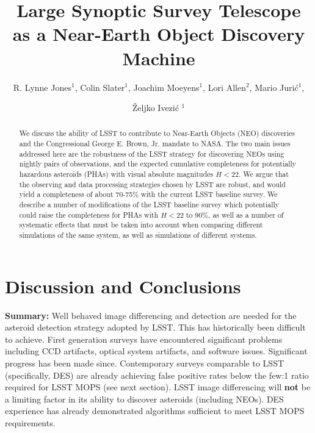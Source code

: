 \documentclass[12pt,preprint]{aastex}
\begin{document}
\title{Large Synoptic Survey Telescope as a Near-Earth Object Discovery Machine}

\author{R. Lynne Jones$^1$, Colin Slater$^1$, Joachim Moeyens$^1$, 
Lori Allen$^2$, Mario Juri\'{c}$^1$,  \and \v{Z}eljko Ivezi\'{c} $^1$}


\begin{abstract}
We discuss the ability of LSST to contribute to Near-Earth Objects (NEO) discoveries and
the Congressional George E. Brown, Jr. mandate to NASA. The two main issues addressed 
here are the robustness of the LSST strategy for discovering NEOs using nightly pairs of 
observations, and the expected cumulative completeness for potentially hazardous asteroids
(PHAs) with visual absolute magnitudes $H<22$.  We argue that the observing and data 
processing strategies chosen by LSST are robust, and would yield a completeness of about 
70-75\% with the current LSST baseline survey. We describe a number of modifications of the 
LSST baseline survey which potentially could raise the completeness for PHAs with $H<22$
to 90\%, as well as a number of systematic effects that must be taken into account when
comparing different simulations of the same system, as well as simulations of different
systems. 
\end{abstract}

\keywords{}

 

 



 




\section{Discussion and Conclusions}


{\bf Summary:} Well behaved image differencing and detection are needed for the
asteroid detection strategy adopted by LSST. This has historically
been difficult to achieve. First generation surveys have encountered
significant problems including CCD artifacts, optical system
artifacts, and software issues. Significant progress has been made
since. Contemporary surveys comparable to LSST (specifically, DES) are
already achieving false positive rates below the few:1 ratio required
for LSST MOPS (see next section). LSST image differencing will {\bf
not} be a limiting factor in its ability to discover asteroids
(including NEOs). DES experience has already demonstrated algorithms 
sufficient to meet LSST MOPS requirements.
\end{document}
